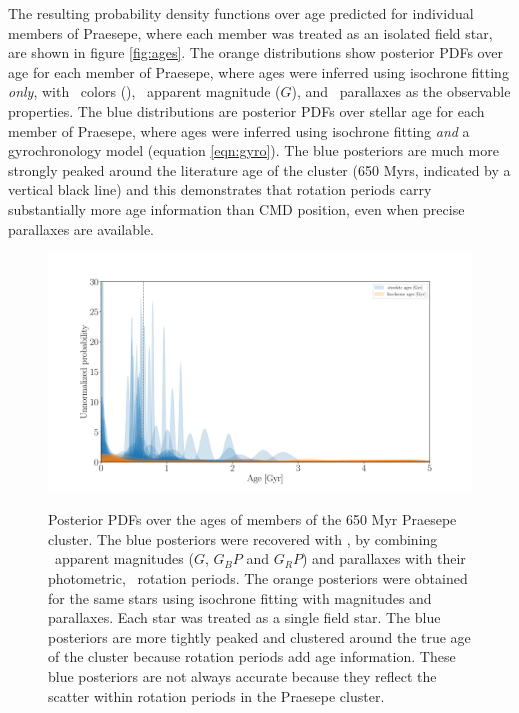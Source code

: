 The resulting probability density functions over age predicted for individual
members of Praesepe, where each member was treated as an isolated field star,
are shown in figure \ref{fig:ages}.
The orange distributions show posterior PDFs over age for each member of
Praesepe, where ages were inferred using isochrone fitting {\it only},
with \gaia\ colors (\gcolor), \gaia\ apparent magnitude ($G$), and \gaia\
parallaxes as the observable properties.
The blue distributions are posterior PDFs over stellar age for each member of
Praesepe, where ages were inferred using isochrone fitting {\it and}
a gyrochronology model (equation \ref{eqn:gyro}).
The blue posteriors are much more strongly peaked around the literature age of
the cluster (650 Myrs, indicated by a vertical black line) and this
demonstrates that rotation periods carry substantially more age information
than CMD position, even when precise parallaxes are available.
\begin{figure}
  \caption{
Posterior PDFs over the ages of members of the 650 Myr Praesepe cluster.
The blue posteriors were recovered with \sd, by combining \gaia\ apparent
    magnitudes ($G$, $G_BP$ and $G_RP$) and parallaxes with their photometric,
    \ktwo\ rotation periods.
The orange posteriors were obtained for the same stars using isochrone fitting
    with \gaia magnitudes and parallaxes.
Each star was treated as a single field star.
The blue posteriors are more tightly peaked and clustered around the true age
of the cluster because rotation periods add age information.
These blue posteriors are not always accurate because they reflect the scatter
within rotation periods in the Praesepe cluster.
}
  \centering
    \includegraphics[width=1\textwidth]{praesepe_results}
\label{fig:praesepe}
\end{figure}

